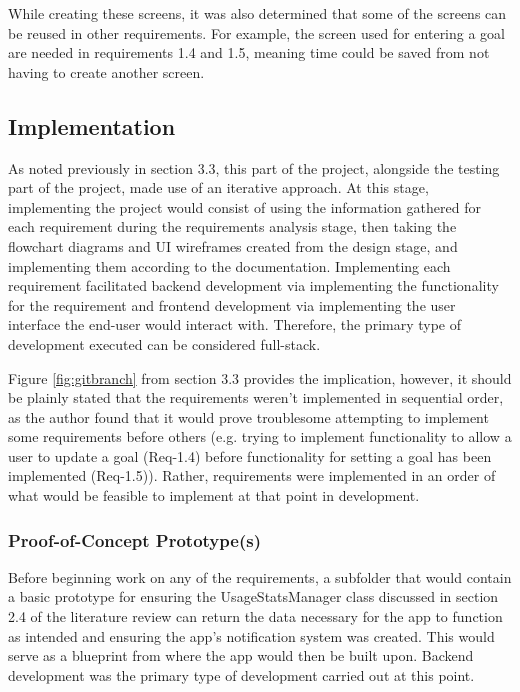 \documentclass[12pt]{article}
\begin{document}
While creating these screens, it was also determined that some of the screens can be reused in other requirements. For example, the screen used for entering a goal are needed in requirements 1.4 and
1.5, meaning time could be saved from not having to create another screen.

\newpage

\subsection{Implementation}
As noted previously in section 3.3, this part of the project, alongside the testing part of the project, made use of an iterative approach. At this stage, implementing the project would consist
of using the information gathered for each requirement during the requirements analysis stage, then taking the flowchart diagrams and UI wireframes created from the design stage, and implementing
them according to the documentation. Implementing each requirement facilitated backend development via implementing the functionality for the requirement and frontend development via implementing
the user interface the end-user would interact with. Therefore, the primary type of development executed can be considered full-stack. \newline

Figure \ref{fig:gitbranch} from section 3.3 provides the implication, however, it should be plainly stated that the requirements weren't implemented in sequential order, as the author found that it
would prove troublesome attempting to implement some requirements before others (e.g. trying to implement functionality to allow a user to update a goal (Req-1.4) before functionality for setting
a goal has been implemented (Req-1.5)). Rather, requirements were implemented in an order of what would be feasible to implement at that point in development.

\subsubsection{Proof-of-Concept Prototype(s)}
Before beginning work on any of the requirements, a subfolder that would contain a basic prototype for ensuring the UsageStatsManager class discussed in section 2.4 of the literature review can 
return the data necessary for the app to function as intended and ensuring the app's notification system was created. This would serve as a blueprint from where the app would then be built upon. 
Backend development was the primary type of development carried out at this point.
\end{document}

